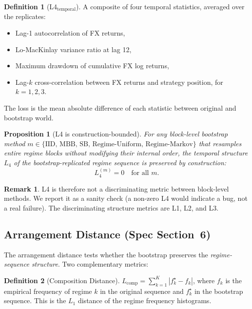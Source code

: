 \documentclass[11pt,a4paper]{article}
\newtheorem{proposition}[theorem]{Proposition}
\theoremstyle{definition}
\newtheorem{definition}{Definition}
\newtheorem{remark}{Remark}
\begin{document}
\begin{definition}[L4$_{\text{temporal}}$]
A composite of four temporal statistics, averaged over the replicates:
\begin{itemize}[leftmargin=2em]
  \item Lag-1 autocorrelation of FX returns,
  \item Lo-MacKinlay variance ratio at lag 12,
  \item Maximum drawdown of cumulative FX log returns,
  \item Lag-$k$ cross-correlation between FX returns and strategy position, for $k=1,2,3$.
\end{itemize}
The loss is the mean absolute difference of each statistic between original and bootstrap world.
\end{definition}

\begin{proposition}[L4 is construction-bounded]
For any block-level bootstrap method $m \in \{\text{IID, MBB, SB,
Regime-Uniform, Regime-Markov}\}$ that resamples entire regime
blocks without modifying their internal order, the temporal
structure $L_4$ of the bootstrap-replicated regime sequence is
\emph{preserved by construction}:
\[
L_4^{(m)} = 0 \quad \text{for all } m.
\]
\end{proposition}

\begin{remark}
L4 is therefore not a discriminating metric between block-level
methods. We report it as a sanity check (a non-zero L4 would
indicate a bug, not a real failure). The discriminating structure
metrics are L1, L2, and L3.
\end{remark}

\subsection{Arrangement Distance (Spec Section~6)}

The arrangement distance tests whether the bootstrap preserves the \emph{regime-sequence structure}. Two complementary metrics:

\begin{definition}[Composition Distance]
$L_{\text{comp}} = \sum_{k=1}^{K} |f^{\star}_k - f_k|$, where $f_k$ is the empirical frequency of regime $k$ in the original sequence and $f^{\star}_k$ in the bootstrap sequence. This is the $L_1$ distance of the regime frequency histograms.
\end{definition}
\end{document}
